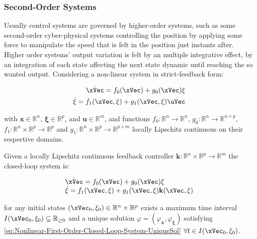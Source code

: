 \subsubsection{Second-Order Systems}
\label{subsub:higher_order_systems}

Usually control systems are governed by higher-order systems, such as some second-order cyber-physical systems controlling the position by applying some force to manipulate the speed that is felt in the position just instants after.  Higher order systems' output variation is felt by an multiple integrative effect, by an integration of each state affecting the next state dynamic until reaching the so wanted output. Considering a non-linear system in strict-feedback form:

\begin{subequations}
    
    \label{eq:HH-NL-System}
    \begin{align}
        \dot{\xVec} = f_0(\xVec) + g_0(\xVec) \mathbf{\xi} 
        \label{eq:HH-NL-System-1stOrder}\\
        \dot{ \mathbf{\xi} } =  f_1(\xVec, \mathbf{\xi}) + g_1(\xVec, \mathbf{\xi}) \uVec
        \label{eq:HH-NL-System-2ndOrder}
    \end{align}
\end{subequations}

with \(\mathbf{x} \in \mathbb{R}^n \), \(\mathbf{\xi} \in \mathbb{R}^p \), and \(\mathbf{u} \in \mathbb{R}^m \), and functions \(f_0: \mathbb{R}^n \to \mathbb{R}^n \), \(g_0: \mathbb{R}^n \to \mathbb{R}^{n \times p} \), \(f_1: \mathbb{R}^n \times \mathbb{R}^p \to \mathbb{R}^p \) and \(g_1: \mathbb{R}^n \times \mathbb{R}^p \to \mathbb{R}^{ p \times m} \) locally Lipschitz continuous on their respective domains. \par
Given a locally Lipschitz continuous feedback controller \(\mathbf{k}: \mathbb{R}^n \times \mathbb{R}^p \to \mathbb{R}^m  \) the closed-loop system is:

\begin{equation}
    \begin{array}{l}
        \dot{\xVec} = f_0(\xVec) + g_0(\xVec) \mathbf{\xi}\\ 
        \dot{ \mathbf{\xi} } =  f_1(\xVec, \mathbf{\xi}) + g_1(\xVec, \mathbf{\xi}) \mathbf{k}(\xVec, \mathbf{\xi})
    \end{array}
 \label{eq:HH-NL-CL-System}
\end{equation}

for any initial states \((\xVec_0, \mathbf{\xi}_0) \in \mathbb{R}^n \times \mathbb{R}^p\) exists a maximum time interval \(I(\xVec_0, \mathbf{\xi}_0) \subseteq \mathbb{R}_{\geq 0}  \) and a unique solution \( \varphi = (\varphi_{\mathbf{x}}, \varphi_{\mathbf{\xi}}) \) satisfying \ref{eq:Nonlinear-First-Order-Closed-Loop-System-UniqueSol} \(\forall t \in I(\xVec_0, \mathbf{\xi}_0) \). \\



